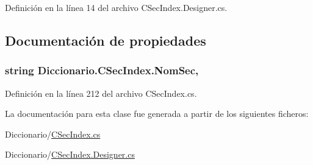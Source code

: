Definición en la línea 14 del archivo C\-Sec\-Index.\-Designer.\-cs.



\subsection{Documentación de propiedades}
\hypertarget{class_diccionario_1_1_c_sec_index_a709ba4feff6de5534dcd4345868e2301}{
\subsubsection[{Nom\-Sec}]{\setlength{\rightskip}{0pt plus 5cm}string Diccionario.\-C\-Sec\-Index.\-Nom\-Sec\hspace{0.3cm}{\ttfamily [get]}, {\ttfamily [set]}}}\label{class_diccionario_1_1_c_sec_index_a709ba4feff6de5534dcd4345868e2301}


Definición en la línea 212 del archivo C\-Sec\-Index.\-cs.



La documentación para esta clase fue generada a partir de los siguientes ficheros\-:\begin{DoxyCompactItemize}
\item 
Diccionario/\hyperlink{_c_sec_index_8cs}{C\-Sec\-Index.\-cs}\item 
Diccionario/\hyperlink{_c_sec_index_8_designer_8cs}{C\-Sec\-Index.\-Designer.\-cs}\end{DoxyCompactItemize}

